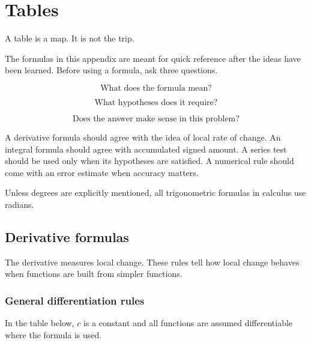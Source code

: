 
\chapter{Tables}
\label{app:tables}

A table is a map.  It is not the trip.

The formulas in this appendix are meant for quick reference after the ideas have been
learned.  Before using a formula, ask three questions.

\[
\text{What does the formula mean?}
\]

\[
\text{What hypotheses does it require?}
\]

\[
\text{Does the answer make sense in this problem?}
\]

A derivative formula should agree with the idea of local rate of change.  An integral
formula should agree with accumulated signed amount.  A series test should be used
only when its hypotheses are satisfied.  A numerical rule should come with an error
estimate when accuracy matters.

Unless degrees are explicitly mentioned, all trigonometric formulas in calculus use
radians.

\section{Derivative formulas}
\label{appsec:derivative-formulas}

The derivative measures local change.  These rules tell how local change behaves when
functions are built from simpler functions.

\subsection{General differentiation rules}
\label{appsubsec:general-differentiation-rules}

In the table below, \(c\) is a constant and all functions are assumed differentiable
where the formula is used.

